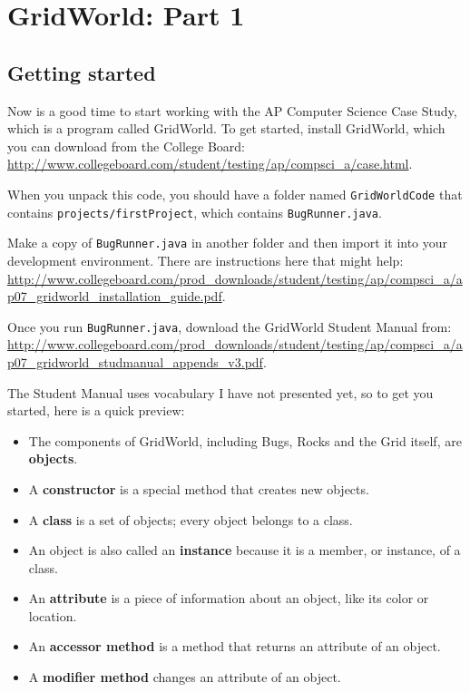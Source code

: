 \chapter{GridWorld: Part 1}
\label{gridworld1}


\section{Getting started}

Now is a good time to start working with the AP Computer Science Case Study, which is a program called GridWorld.
To get started, install GridWorld, which you can download from the College Board:
\url{http://www.collegeboard.com/student/testing/ap/compsci_a/case.html}.

When you unpack this code, you should have a folder named {\tt GridWorldCode} that contains {\tt projects/firstProject}, which contains {\tt BugRunner.java}.

Make a copy of {\tt BugRunner.java} in another folder and then import it into your development environment.
There are instructions here that might help:
\url{http://www.collegeboard.com/prod_downloads/student/testing/ap/compsci_a/ap07_gridworld_installation_guide.pdf}.

Once you run {\tt BugRunner.java}, download the GridWorld Student Manual from:
\url{http://www.collegeboard.com/prod_downloads/student/testing/ap/compsci_a/ap07_gridworld_studmanual_appends_v3.pdf}.

The Student Manual uses vocabulary I have not presented yet, so to get you started, here is a quick preview:

\begin{itemize}

\item The components of GridWorld, including Bugs, Rocks and the Grid itself, are {\bf objects}.

\item A {\bf constructor} is a special method that creates new objects.

\item A {\bf class} is a set of objects; every object belongs to a class.

\item An object is also called an {\bf instance} because it is a member, or instance, of a class.

\item An {\bf attribute} is a piece of information about an object, like its color or location.

\item An {\bf accessor method} is a method that returns an attribute of an object.

\item A {\bf modifier method} changes an attribute of an object.

\end{itemize}

